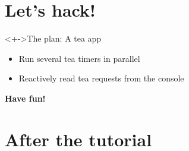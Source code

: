 \documentclass[handout]{enigtex-beamer-base}
\begin{document}
\begin{comment}
	Introduction what Rhine can do
	Basic vocab
		Arrowized FRP
		Synchronous subsystems
		Clocks
		Schedules
		Resampling buffers
		Events and behaviours
	Comparison (differences, +, -) to
		Yampa
		dunai, auto, varying
		classical FRP
		Pipes, conduit
	Further plan
		Mission statement what we want to implement
			Ideas
				FRP zoo
					Extra features?
				Tea time
					First without, then with GUI
		Given enough time, implement audience suggestions
\end{comment}

\section{Let's hack!}

\begin{frame}
\begin{block}<+->{The plan: A tea app}
	\begin{itemize}
		\item Run several tea timers in parallel
		\item Reactively read tea requests from the console
	\end{itemize}
\end{block}
\end{frame}

\begin{frame}
\textbf{Have fun!}
\end{frame}

\section{After the tutorial}
\end{document}
